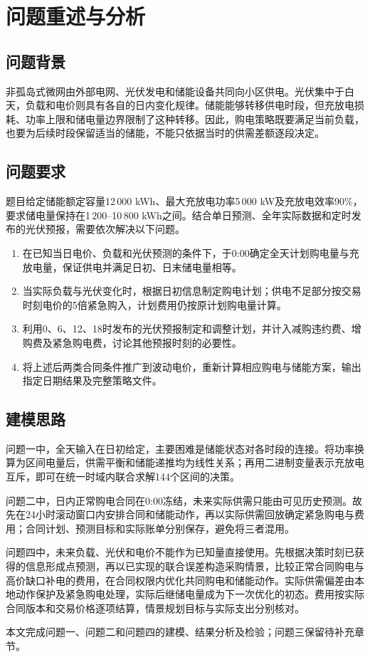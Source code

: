 \section{问题重述与分析}
\subsection{问题背景}
非孤岛式微网由外部电网、光伏发电和储能设备共同向小区供电。光伏集中于白天，负载和电价则具有各自的日内变化规律。储能能够转移供电时段，但充放电损耗、功率上限和储电量边界限制了这种转移。因此，购电策略既要满足当前负载，也要为后续时段保留适当的储能，不能只依据当时的供需差额逐段决定。

\subsection{问题要求}
题目给定储能额定容量12\,000 kWh、最大充放电功率5\,000 kW及充放电效率90\%，要求储电量保持在1\,200--10\,800 kWh之间。结合单日预测、全年实际数据和定时发布的光伏预报，需要依次解决以下问题。
\begin{enumerate}
  \item 在已知当日电价、负载和光伏预测的条件下，于0:00确定全天计划购电量与充放电量，保证供电并满足日初、日末储电量相等。
  \item 当实际负载与光伏变化时，根据日初信息制定购电计划；供电不足部分按交易时刻电价的5倍紧急购入，计划费用仍按原计划购电量计算。
  \item 利用0、6、12、18时发布的光伏预报制定和调整计划，并计入减购违约费、增购费及紧急购电费，讨论其他预报时刻的必要性。
  \item 将上述后两类合同条件推广到波动电价，重新计算相应购电与储能方案，输出指定日期结果及完整策略文件。
\end{enumerate}

\subsection{建模思路}
问题一中，全天输入在日初给定，主要困难是储能状态对各时段的连接。将功率换算为区间电量后，供需平衡和储能递推均为线性关系；再用二进制变量表示充放电互斥，即可在统一时域内联合求解144个区间的决策。

问题二中，日内正常购电合同在0:00冻结，未来实际供需只能由可见历史预测。故先在24小时滚动窗口内安排合同和储能动作，再以实际供需回放确定紧急购电与费用；合同计划、预测目标和实际账单分别保存，避免将三者混用。

问题四中，未来负载、光伏和电价不能作为已知量直接使用。先根据决策时刻已获得的信息形成点预测，再以已实现的联合误差构造采购情景，比较正常合同购电与高价缺口补电的费用，在合同权限内优化共同购电和储能动作。实际供需偏差由本地动作保护及紧急购电处理，实际后继储电量成为下一次优化的初态。费用按实际合同版本和交易价格逐项结算，情景规划目标与实际支出分别核对。

本文完成问题一、问题二和问题四的建模、结果分析及检验；问题三保留待补充章节。
